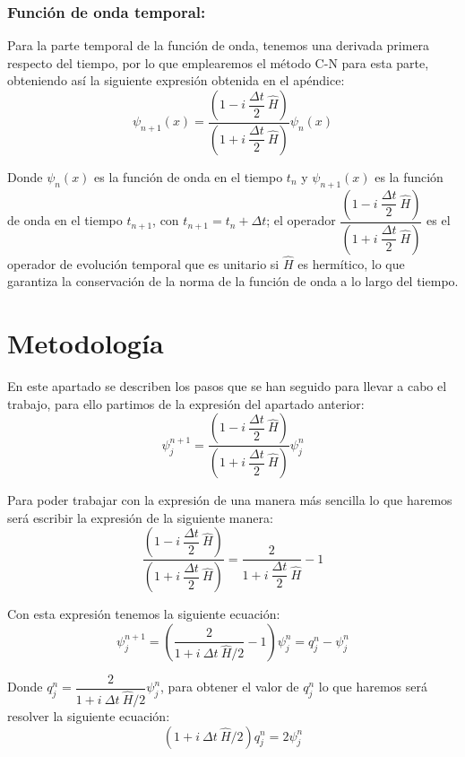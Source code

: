 \documentclass[10pt,onecolumn]{article}
\begin{document}
\subsubsection{Función de onda temporal:}
Para la parte temporal de la función de onda, tenemos una derivada primera respecto del tiempo, por lo que emplearemos el método C-N para esta parte, obteniendo así la siguiente expresión obtenida en el apéndice:
\begin{equation}
    \psi_{n+1}(x) =\dfrac{(1 - i\ \dfrac{\Delta t}{2}\ \hat{H})}{(1 + i\ \dfrac{\Delta t}{2}\ \hat{H})}\psi_n(x)
\end{equation}

Donde $\psi_n(x)$ es la función de onda en el tiempo $t_n$ y $\psi_{n+1}(x)$ es la función de onda en el tiempo $t_{n+1}$, con $t_{n+1} = t_n + \Delta t$; el operador $\dfrac{(1 - i\ \dfrac{\Delta t}{2}\ \hat{H})}{(1 + i\ \dfrac{\Delta t}{2}\ \hat{H})}$ es el operador de evolución temporal que es unitario si $\hat{H}$ es hermítico, lo que garantiza la conservación de la norma de la función de onda a lo largo del tiempo.


\section{Metodología}

En este apartado se describen los pasos que se han seguido para llevar a cabo el trabajo, para ello partimos de la expresión del apartado anterior:
\begin{equation}
    \psi^{n+1}_j =\dfrac{(1 - i\ \dfrac{\Delta t}{2}\ \hat{H})}{(1 + i\ \dfrac{\Delta t}{2}\ \hat{H})}\psi^n_j
\end{equation}

Para poder trabajar con la expresión de una manera más sencilla lo que haremos será escribir la expresión de la siguiente manera:
\begin{equation}
    \dfrac{(1 - i\ \dfrac{\Delta t}{2}\ \hat{H})}{(1 + i\ \dfrac{\Delta t}{2}\ \hat{H})} = \dfrac{2}{1+i\ \dfrac{\Delta t}{2}\ \hat{H}} -1
\end{equation}

Con esta expresión tenemos la siguiente ecuación:
\begin{equation}\label{eq:Relacion_q_psi}
    \psi^{n+1}_j = (\dfrac{2}{1+i\ \Delta t\ \hat{H}/2} - 1)\psi^n_j = q^n_j - \psi^n_j
\end{equation}

Donde $q^n_j = \dfrac{2}{1+i\ \Delta t\ \hat{H}/2}\psi^n_j$, para obtener el valor de $q^n_j$ lo que haremos será resolver la siguiente ecuación:
\begin{equation}
    (1+i\ \Delta t\ \hat{H}/2)q^n_j = 2\psi^n_j
\end{equation}
\end{document}
